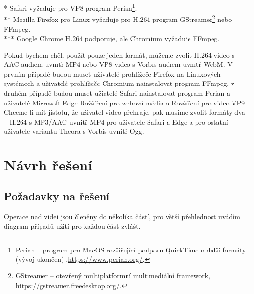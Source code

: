 * Safari vyžaduje pro VP8 program Perian\footnote{Perian -- program pro MacOS rozšiřující podporu QuickTime o další formáty (vývoj ukončen) ,\url{https://www.perian.org/}.}.\\
** Mozilla Firefox pro Linux vyžaduje pro H.264 program GStreamer\footnote{GStreamer -- otevřený multiplatformní multimediální framework, \url{https://gstreamer.freedesktop.org/}.} nebo FFmpeg.\\
*** Google Chrome H.264 podporuje, ale Chromium vyžaduje FFmpeg.
\medskip

Pokud bychom chěli použít pouze jeden formát, můžeme zvolit H.264 video s AAC audiem uvnitř MP4 nebo VP8 video s Vorbis audiem uvnitř WebM. V prvním případě budou muset uživatelé prohlížeče Firefox na Linuxových systémech a uživatelé prohlížeče Chromium nainstalovat program FFmpeg, v druhém případě budou muset užiatelé Safari nainstalovat program Perian a uživatelé Microsoft Edge Rožšíření pro webová média a Rozšíření pro video VP9. Chceme-li mít jistotu, že uživatel video přehraje, pak musíme zvolit formáty dva -- H.264 s MP3/AAC uvnitř MP4 pro uživatele Safari a Edge a pro ostatní uživatele variantu Theora s Vorbis uvnitř Ogg.
\chapter{Návrh řešení}
\section{Požadavky na řešení}
Operace nad videi jsou členěny do několika částí, pro větší přehlednost uvádím diagram případů užití pro každou část zvlášť.

